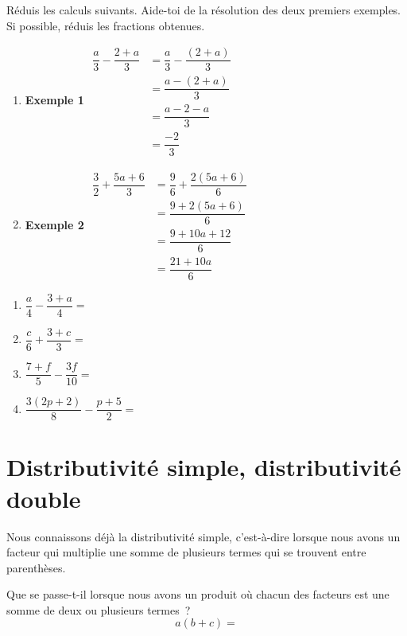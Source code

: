\documentclass[../math2.tex]{subfiles}
\begin{document}
\newpage
\begin{exercise}
  Réduis les calculs suivants. Aide-toi de la résolution des deux premiers exemples. Si possible, réduis les fractions obtenues. \\
  \begin{enumerate}[cols=2, label=]
    \item 
    \textbf{Exemple 1}
    \medbreak
      $\begin{aligned}
      \dfrac{a}{3} - \dfrac{2+a}{3} 
      &= \dfrac{a}{3} - \dfrac{\left(2+a\right)}{3}\\
      &= \dfrac{a-\left(2+a\right)}{3}\\
      &= \dfrac{a-2-a}{3}\\
      &= \dfrac{-2}{3}
    \end{aligned}$
    \item   
    \textbf{Exemple 2}
    \medbreak
      $\begin{aligned}
      \dfrac{3}{2} + \dfrac{5a+6}{3} 
      &= \dfrac{9}{6} + \dfrac{2\left(5a+6\right)}{6}\\
      &= \dfrac{9+2\left(5a+6\right)}{6}\\
      &= \dfrac{9+10a+12}{6} \\
      &= \dfrac{21+10a}{6}
    \end{aligned}$
  \end{enumerate}

  \begin{enumerate}[cols=2, itemsep=7cm]
    \item  $\dfrac{a}{4}-\dfrac{3+a}{4}=$
    \item  $\dfrac{c}{6} + \dfrac{3+c}{3}=$
    \item  $\dfrac{7+f}{5}-\dfrac{3f}{10}=$
    \item  $\dfrac{3(2p+2)}{8} - \dfrac{p+5}{2}=$
  \end{enumerate}
\end{exercise}

\vspace*{6cm}

\newpage
\section{Distributivité simple, distributivité double}
Nous connaissons déjà la distributivité simple, c'est-à-dire lorsque nous avons un facteur qui multiplie une somme de plusieurs termes qui se trouvent entre parenthèses.

Que se passe-t-il lorsque nous avons un produit où chacun des facteurs est une somme de deux ou plusieurs termes~?
\[a\left(b+c\right)=\]
\end{document}
